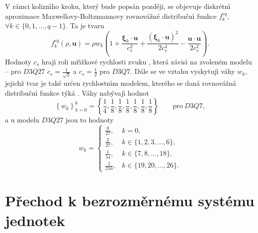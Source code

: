         V r\'{a}mci kolizn\'{\i}ho kroku, kter\'{y} bude pops\'{a}n pozd\v{e}ji, se objevuje diskr\'{e}tn\'{\i} aproximace Maxwellovy-Boltzmannovy rovnov\'{a}\v{z}n\'{e} distribu\v{c}n\'{\i} funkce $f_{k}^{eq}$, $\forall k \in \{0,1,...,q-1 \}$. Ta je tvaru
        \begin{equation}
        \label{eq:EquDisFun}
            f_{k}^{eq}(\rho, \boldsymbol{u}) = \rho w_{k} \left( 1 + \frac{\boldsymbol{\xi}_{k} \cdot \boldsymbol{u}}{c_{s}^{2}} + \frac{(\boldsymbol{\xi}_{k} \cdot \boldsymbol{u})^{2}}{2c_{s}^{4}} - \frac{\boldsymbol{u} \cdot \boldsymbol{u}}{2c_{s}^{2}} \right).
        \end{equation}
        Hodnoty $c_s$ hraj\'{\i} roli m\v{r}\'{\i}\v{z}kov\'{e} rychlosti zvuku , kter\'{a} z\'{a}vis\'{\i} na zvolen\'{e}m modelu -- pro $D3Q27$ $c_s = \frac{1}{\sqrt{3}}$ a $c_s = \frac{1}{2}$ pro $D3Q7$. D\'{a}le se ve vztahu vyskytuj\'{\i} v\'{a}hy $w_k$, jejich\v{z} tvar je tak\'{e} ur\v{c}en rychlostn\'{\i}m modelem, kter\'{e}ho se dan\'{a} rovnov\'{a}\v{z}n\'{a} distribu\v{c}n\'{\i} funkce t\'{y}k\'{a} \cite{zou1995improved}. V\'{a}hy nab\'{y}vaj\'{\i} hodnot
        \begin{equation}
            \label{eq:VahyD3Q7}
                \left\{w_k\right\}_{k=0}^{6
                } = \left\{ \frac{1}{4}, \frac{1}{8}, \frac{1}{8}, \frac{1}{8}, \frac{1}{8}, \frac{1}{8}, \frac{1}{8} \right\} \qquad \mathrm{pro} \ D3Q7,
            \end{equation}
       a u modelu $D3Q27$ jsou to hodnoty
        \begin{equation}
            w_k = 
            \begin{cases} 
            \frac{8}{27}, & k = 0, \\ 
            \frac{2}{27}, & k \in \{ 1,2,3,...,6 \}, \\
            \frac{1}{54}, & k \in \{ 7,8,...,18 \}, \\
            \frac{1}{216}, & k \in \{ 19,20,...,26 \}.
            \end{cases} 
        \end{equation}
        


    
    \section{P\v{r}echod k bezrozm\v{e}rn\'{e}mu syst\'{e}mu jednotek}
    \label{sub:SysUni}    

